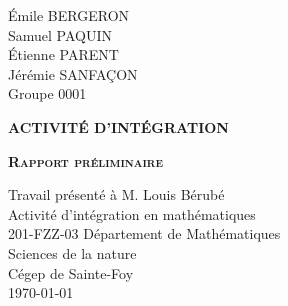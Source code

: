 \begin{titlepage}
    \noindent
    Émile BERGERON\\
    Samuel PAQUIN\\
    Étienne PARENT\\
    Jérémie SANFAÇON\\
    \noindent
    Groupe 0001


    \indent
	\centering
	\vspace{2cm}

	{\scshape\textbf{ACTIVITÉ D'INTÉGRATION}}\\
	{\scshape\textbf{Rapport préliminaire}\par}
	\vspace{2cm}
	{Travail présenté à M.  Louis Bérubé}\\
	\vspace{2cm}
	{Activité d'intégration en mathématiques}\\
    {201-FZZ-03}
	\vfill
	{Département de Mathématiques}\\
	{Sciences de la nature}\\
	{Cégep de Sainte-Foy}\\
	{\large \today}
\end{titlepage}
